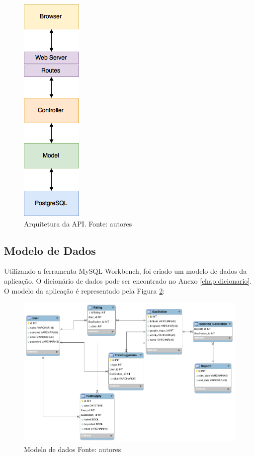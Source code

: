 \begin{figure}[H]
    \centering
    \includegraphics[scale=0.5]{figuras/api_arch.png}
    \caption[Arquitetura da API]{Arquitetura da API. Fonte: autores}
    \label{img:arquitetura}
\end{figure}


\subsection{Modelo de Dados}

Utilizando a ferramenta MySQL Workbench, foi criado um modelo de dados da aplicação. O dicionário de dados pode ser encontrado no Anexo \ref{chap:dicionario}. O modelo da aplicação é representado pela Figura \ref{img:modelo_de_dados}:

\begin{figure}[H]
    \centering
    \includegraphics[scale=0.5]{figuras/db_model.png}
    \caption[Modelo de dados]{Modelo de dados Fonte: autores}
    \label{img:modelo_de_dados}
\end{figure}
